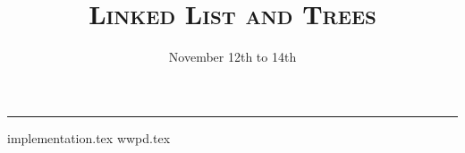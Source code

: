 \documentclass{exam}
\title{\textsc{Linked List and Trees}}
\date{November 12th to 14th}
\begin{document}
\maketitle
\rule{\textwidth}{0.15em}
\fontsize{12}{15}\selectfont


\begin{questions}
{implementation.tex}
{wwpd.tex}



\end{questions}
\end{document}
